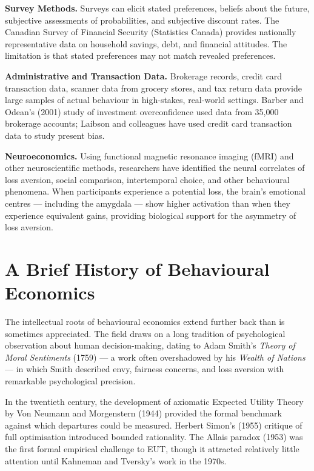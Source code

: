 \documentclass[12pt, letterpaper]{article}
\begin{document}
\textbf{Survey Methods.} Surveys can elicit stated preferences, beliefs about the future, subjective assessments of probabilities, and subjective discount rates. The Canadian Survey of Financial Security (Statistics Canada) provides nationally representative data on household savings, debt, and financial attitudes. The limitation is that stated preferences may not match revealed preferences.

\textbf{Administrative and Transaction Data.} Brokerage records, credit card transaction data, scanner data from grocery stores, and tax return data provide large samples of actual behaviour in high-stakes, real-world settings. Barber and Odean's (2001) study of investment overconfidence used data from 35,000 brokerage accounts; Laibson and colleagues have used credit card transaction data to study present bias.

\textbf{Neuroeconomics.} Using functional magnetic resonance imaging (fMRI) and other neuroscientific methods, researchers have identified the neural correlates of loss aversion, social comparison, intertemporal choice, and other behavioural phenomena. When participants experience a potential loss, the brain's emotional centres --- including the amygdala --- show higher activation than when they experience equivalent gains, providing biological support for the asymmetry of loss aversion.

\medskip


\section{A Brief History of Behavioural Economics}


The intellectual roots of behavioural economics extend further back than is sometimes appreciated. The field draws on a long tradition of psychological observation about human decision-making, dating to Adam Smith's \textit{Theory of Moral Sentiments} (1759) --- a work often overshadowed by his \textit{Wealth of Nations} --- in which Smith described envy, fairness concerns, and loss aversion with remarkable psychological precision.

In the twentieth century, the development of axiomatic Expected Utility Theory by Von Neumann and Morgenstern (1944) provided the formal benchmark against which departures could be measured. Herbert Simon's (1955) critique of full optimisation introduced bounded rationality. The Allais paradox (1953) was the first formal empirical challenge to EUT, though it attracted relatively little attention until Kahneman and Tversky's work in the 1970s.
\end{document}
